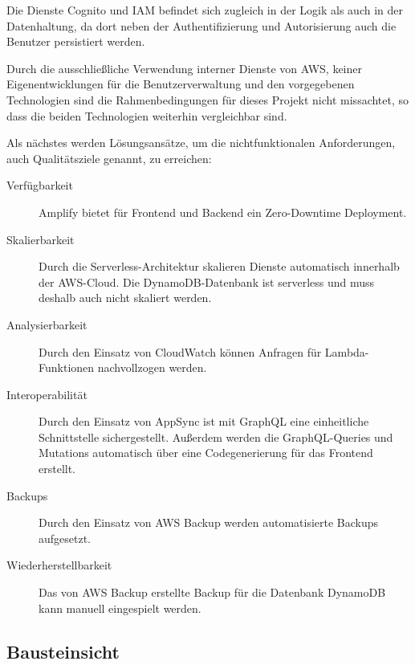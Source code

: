 Die Dienste Cognito und IAM befindet sich zugleich in der Logik als auch in der Datenhaltung, da dort neben der Authentifizierung und Autorisierung auch die Benutzer persistiert werden.

Durch die ausschließliche Verwendung interner Dienste von \ac{AWS}, keiner Eigenentwicklungen für die Benutzerverwaltung und den vorgegebenen Technologien sind die Rahmenbedingungen für dieses Projekt nicht missachtet, so dass die beiden Technologien weiterhin vergleichbar sind.

Als nächstes werden Lösungsansätze, um die nichtfunktionalen Anforderungen, auch Qualitätsziele genannt, zu erreichen:

\begin{description}
   \item[Verfügbarkeit] Amplify bietet für Frontend und Backend ein Zero-Downtime Deployment.
   \item[Skalierbarkeit] Durch die Serverless-Architektur skalieren Dienste automatisch innerhalb der \ac{AWS}-Cloud. Die DynamoDB-Datenbank ist serverless und muss deshalb auch nicht skaliert werden.
   \item[Analysierbarkeit] Durch den Einsatz von CloudWatch können Anfragen für Lambda-Funktionen nachvollzogen werden.
   \item[Interoperabilität] Durch den Einsatz von AppSync ist mit GraphQL eine einheitliche Schnittstelle sichergestellt. Außerdem werden die GraphQL-Queries und Mutations automatisch über eine Codegenerierung für das Frontend erstellt.
   \item[Backups] Durch den Einsatz von AWS Backup werden automatisierte Backups aufgesetzt.
   \item[Wiederherstellbarkeit] Das von AWS Backup erstellte Backup für die Datenbank DynamoDB kann manuell eingespielt werden.
\end{description}

\subsection{Bausteinsicht}

